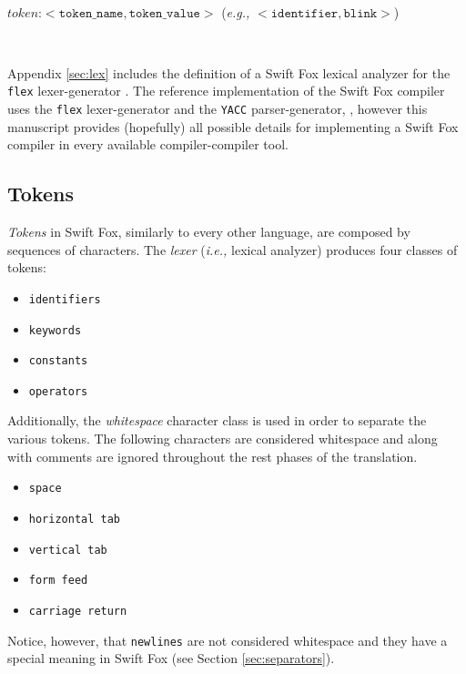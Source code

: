 \documentclass[11pt]{article}
\begin{document}
\

$\textit{token:} <\texttt{token\_name}, \texttt{token\_value}>$
(\textit{e.g.,} $<\texttt{identifier}, \texttt{blink}>$)

\

\hangindent=4cm
\small
\noindent
Appendix \ref{sec:lex} includes the definition of a Swift Fox lexical
analyzer for the \texttt{flex} lexer-generator \cite{lesk:1990,paxson:2010}.
The reference implementation of the Swift Fox compiler uses the
\texttt{flex} lexer-generator and the \texttt{YACC} parser-generator,
\cite{johnson:1975,bison:2010}, however this manuscript provides
(hopefully) all possible details for implementing a Swift Fox compiler in
every available compiler-compiler tool.
\normalsize

\subsection{Tokens}

\textit{Tokens} in Swift Fox, similarly to every other language, are
composed by sequences of characters. The \textit{lexer} (\textit{i.e.,}
lexical analyzer) produces four classes of tokens:
\begin{itemize}
	\item \texttt{identifiers}
	\item \texttt{keywords}
	\item \texttt{constants}
	\item \texttt{operators}
\end{itemize}

Additionally, the \textit{whitespace} character class is used in order to
separate the various tokens. The following characters are considered
whitespace and along with comments are ignored throughout the rest phases
of the translation.

\begin{itemize}
	\item \texttt{space}
	\item \texttt{horizontal tab}
	\item \texttt{vertical tab}
	\item \texttt{form feed}
	\item \texttt{carriage return}
\end{itemize}

Notice, however, that \texttt{newlines} are not considered whitespace and
they have a special meaning in Swift Fox (see Section
\ref{sec:separators}).

\
\end{document}
